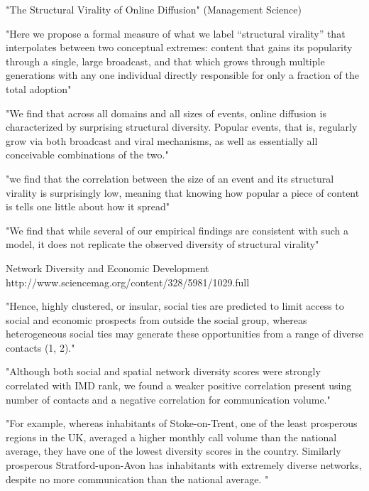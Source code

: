 "The Structural Virality of Online Diffusion" (Management Science)




"Here we propose a formal measure of what we label “structural virality” that interpolates between two conceptual extremes: content that gains its popularity through a single, large broadcast, and that which grows through multiple generations with any one individual directly responsible for only a fraction of the total adoption"

"We find that across all domains and all sizes of events, online diffusion is characterized by surprising structural diversity. Popular events, that is, regularly grow via both broadcast and viral mechanisms, as well as essentially all conceivable combinations of the two."

"we find that the correlation between the size of an event and its structural virality is surprisingly low, meaning that knowing how popular a piece of content is tells one little about how it spread"

"We find that while several of our empirical findings are consistent with such a model, it does not replicate the observed diversity of structural virality"











Network Diversity and Economic Development
http://www.sciencemag.org/content/328/5981/1029.full



"Hence, highly clustered, or insular, social ties are predicted to limit access to social and economic prospects from outside the social group, whereas heterogeneous social ties may generate these opportunities from a range of diverse contacts (1, 2)."

"Although both social and spatial network diversity scores were strongly correlated with IMD rank, we found a weaker positive correlation present using number of contacts and a negative correlation for communication volume."

"For example, whereas inhabitants of Stoke-on-Trent, one of the least prosperous regions in the UK, averaged a higher monthly call volume than the national average, they have one of the lowest diversity scores in the country. Similarly prosperous Stratford-upon-Avon has inhabitants with extremely diverse networks, despite no more communication than the national average. "




